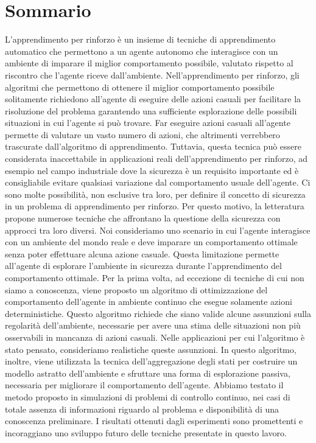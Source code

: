 \chapter*{Sommario}
\sloppy L'apprendimento per rinforzo è un insieme di tecniche di apprendimento automatico che permettono a un agente autonomo che interagisce con un ambiente di imparare il miglior comportamento possibile, valutato rispetto al riscontro che l'agente riceve dall'ambiente. Nell'apprendimento per rinforzo, gli algoritmi che permettono di ottenere il miglior comportamento possibile solitamente richiedono all'agente di eseguire delle azioni casuali per facilitare la risoluzione del problema garantendo una sufficiente esplorazione delle possibili situazioni in cui l'agente si può trovare. Far eseguire azioni casuali all'agente permette di valutare un vasto numero di azioni, che altrimenti verrebbero trascurate dall'algoritmo di apprendimento. Tuttavia, questa tecnica può essere considerata inaccettabile in applicazioni reali dell'apprendimento per rinforzo, ad esempio nel campo industriale dove la sicurezza è un requisito importante ed è consigliabile evitare qualsiasi variazione dal comportamento usuale dell'agente. Ci sono molte possibilità, non esclusive tra loro, per definire il concetto di sicurezza in un problema di apprendimento per rinforzo. Per questo motivo, la letteratura propone numerose tecniche che affrontano la questione della sicurezza con approcci tra loro diversi. Noi consideriamo uno scenario in cui l'agente interagisce con un ambiente del mondo reale e deve imparare un comportamento ottimale senza poter effettuare alcuna azione casuale. Questa limitazione permette all'agente di esplorare l'ambiente in sicurezza durante l'apprendimento del comportamento ottimale. Per la prima volta, ad eccezione di tecniche di cui non siamo a conoscenza, viene proposto un algoritmo di ottimizzazione del comportamento dell'agente in ambiente continuo che esegue solamente azioni deterministiche. Questo algoritmo richiede che siano valide alcune assunzioni sulla regolarità dell'ambiente, necessarie per avere una stima delle situazioni non più osservabili in mancanza di azioni casuali. Nelle applicazioni per cui l'algoritmo è stato pensato, consideriamo realistiche queste assunzioni. In questo algoritmo, inoltre, viene utilizzata la tecnica dell'aggregazione degli stati per costruire un modello astratto dell'ambiente e sfruttare una forma di esplorazione passiva, necessaria per migliorare il comportamento dell'agente. Abbiamo testato il metodo proposto in simulazioni di problemi di controllo continuo, nei casi di totale assenza di informazioni riguardo al problema e disponibilità di una conoscenza preliminare. I risultati ottenuti dagli esperimenti sono promettenti e incoraggiano uno sviluppo futuro delle tecniche presentate in questo lavoro.

\endgroup